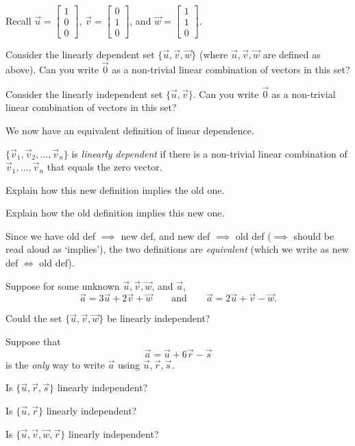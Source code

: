 \documentclass{problemset}
\newcommand{\mat}[1]{\begin{bmatrix}#1\end{bmatrix}}
\begin{document}
	\question
		Recall $\vec u=\mat{1\\0\\0}$, $\vec v=\mat{0\\1\\0}$, and $\vec w=\mat{1\\1\\0}$.
	\begin{parts}
		\item Consider the linearly dependent 
		set $\{\vec u,\vec v,\vec w\}$ (where $\vec u,\vec v,\vec w$
		are defined as above).  Can you write $\vec 0$
		as a non-trivial linear combination of vectors in this set?
		\item Consider the linearly independent 
		set $\{\vec u,\vec v\}$.  Can you write $\vec 0$
		as a non-trivial linear combination of vectors in this set?
	\end{parts}

	We now have an equivalent definition of linear dependence.

	\begin{definition}
	$\{\vec v_1,\vec v_2,\ldots,\vec v_n\}$ is
	\emph{linearly dependent} if there is a non-trivial
	linear combination of $\vec v_1,\ldots,\vec v_n$ that
	equals the zero vector.
	\end{definition}

	\question
	\begin{parts}
		\item Explain how this new definition implies the old one.
		\item Explain how the old definition implies this new one.
	\end{parts}

	Since we have old def $\implies$ new def, and new def $\implies$ old def ($\implies$
	should be read aloud as `implies'), the two definitions
	are \emph{equivalent} (which we write as new def $\iff$ old def).


	\question
	Suppose for some unknown $\vec u, \vec v, \vec w$, and $\vec a$,
	\[
		\vec a = 3\vec u+2\vec v +\vec w\qquad \text{and}\qquad 
		\vec a = 2\vec u+\vec v -\vec w.
	\]
	\begin{parts}
		\item Could the set $\{\vec u,\vec v,\vec w\}$ be linearly
		independent?
	\end{parts}
	Suppose that
	\[
		\vec a = \vec u+6\vec r-\vec s
	\]
	is the \emph{only} way to write $\vec a$ using $\vec u,\vec r,\vec s$.
	\begin{parts}[resume]
		\item Is $\{\vec u,\vec r,\vec s\}$ linearly independent?
		\item Is $\{\vec u,\vec r\}$ linearly independent?
		\item Is $\{\vec u,\vec v,\vec w,\vec r\}$ linearly independent?
	\end{parts}
\end{document}
